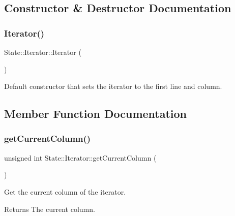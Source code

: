 \subsection{Constructor \& Destructor Documentation}
\mbox{\label{class_state_1_1_iterator_a54547209d50ec7db6bc7303c338573e3}} 
\subsubsection{\texorpdfstring{Iterator()}{Iterator()}}
{\footnotesize\ttfamily State\+::\+Iterator\+::\+Iterator (\begin{DoxyParamCaption}{ }\end{DoxyParamCaption})\hspace{0.3cm}{\ttfamily [inline]}}

Default constructor that sets the iterator to the first line and column. 

\subsection{Member Function Documentation}
\mbox{\label{class_state_1_1_iterator_a9cbebe63fd8659b3330c68c9be7b7278}} 
\subsubsection{\texorpdfstring{get\+Current\+Column()}{getCurrentColumn()}}
{\footnotesize\ttfamily unsigned int State\+::\+Iterator\+::get\+Current\+Column (\begin{DoxyParamCaption}{ }\end{DoxyParamCaption})\hspace{0.3cm}{\ttfamily [inline]}}

Get the current column of the iterator.

\begin{DoxyReturn}{Returns}
The current column. 
\end{DoxyReturn}
\mbox{\label{class_state_1_1_iterator_a48187cf44203889ba25ea78eee4de895}} 
